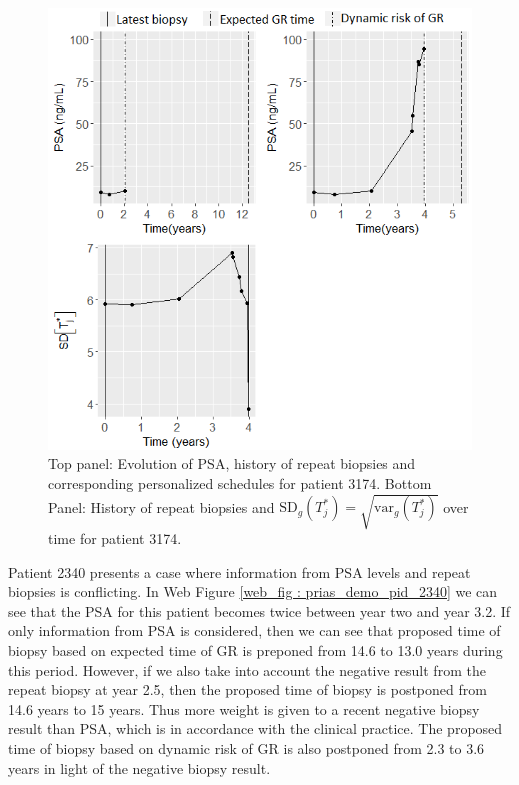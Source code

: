 \begin{figure}
\centerline{\includegraphics[width=\columnwidth]{images/prias_demo/case_3174.png}}
\caption{Top panel: Evolution of PSA, history of repeat biopsies and corresponding personalized schedules for patient 3174. Bottom Panel: History of repeat biopsies and $\mbox{SD}_g(T^*_j) = \sqrt{\mbox{var}_g(T^*_j)}$ over time for patient 3174.}
\label{fig : prias_demo_pid_3174}
\end{figure}


Patient 2340 presents a case where information from PSA levels and repeat biopsies is conflicting. In Web Figure \ref{web_fig : prias_demo_pid_2340} we can see that the PSA for this patient becomes twice between year two and year 3.2. If only information from PSA is considered, then we can see that proposed time of biopsy based on expected time of GR is preponed from 14.6 to 13.0 years during this period. However, if we also take into account the negative result from the repeat biopsy at year 2.5, then the proposed time of biopsy is postponed from 14.6 years to 15 years. Thus more weight is given to a recent negative biopsy result than PSA, which is in accordance with the clinical practice. The proposed time of biopsy based on dynamic risk of GR is also postponed from 2.3 to 3.6 years in light of the negative biopsy result.

